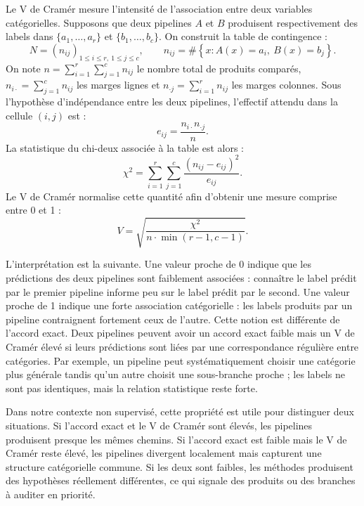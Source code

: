 \documentclass[12pt,a4paper]{report}
\begin{document}
Le V de Cramér mesure l'intensité de l'association entre deux variables catégorielles. Supposons que deux pipelines $A$ et $B$ produisent respectivement des labels dans $\{a_1,\ldots,a_r\}$ et $\{b_1,\ldots,b_c\}$. On construit la table de contingence :
\begin{equation}
    N =
    \left(n_{ij}\right)_{1 \leq i \leq r,\ 1 \leq j \leq c},
    \qquad
    n_{ij}
    =
    \#\left\{x : A(x)=a_i,\ B(x)=b_j\right\}.
\end{equation}
On note $n=\sum_{i=1}^{r}\sum_{j=1}^{c} n_{ij}$ le nombre total de produits comparés, $n_{i\cdot}=\sum_{j=1}^{c}n_{ij}$ les marges lignes et $n_{\cdot j}=\sum_{i=1}^{r}n_{ij}$ les marges colonnes. Sous l'hypothèse d'indépendance entre les deux pipelines, l'effectif attendu dans la cellule $(i,j)$ est :
\begin{equation}
    e_{ij}
    =
    \frac{n_{i\cdot}n_{\cdot j}}{n}.
\end{equation}
La statistique du chi-deux associée à la table est alors :
\begin{equation}
    \chi^2
    =
    \sum_{i=1}^{r}\sum_{j=1}^{c}
    \frac{(n_{ij}-e_{ij})^2}{e_{ij}}.
\end{equation}
Le V de Cramér normalise cette quantité afin d'obtenir une mesure comprise entre 0 et 1 :
\begin{equation}
    V
    =
    \sqrt{
    \frac{\chi^2}
    {n \cdot \min(r-1,c-1)}
    }.
\end{equation}

L'interprétation est la suivante. Une valeur proche de 0 indique que les prédictions des deux pipelines sont faiblement associées : connaître le label prédit par le premier pipeline informe peu sur le label prédit par le second. Une valeur proche de 1 indique une forte association catégorielle : les labels produits par un pipeline contraignent fortement ceux de l'autre. Cette notion est différente de l'accord exact. Deux pipelines peuvent avoir un accord exact faible mais un V de Cramér élevé si leurs prédictions sont liées par une correspondance régulière entre catégories. Par exemple, un pipeline peut systématiquement choisir une catégorie plus générale tandis qu'un autre choisit une sous-branche proche ; les labels ne sont pas identiques, mais la relation statistique reste forte.

Dans notre contexte non supervisé, cette propriété est utile pour distinguer deux situations. Si l'accord exact et le V de Cramér sont élevés, les pipelines produisent presque les mêmes chemins. Si l'accord exact est faible mais le V de Cramér reste élevé, les pipelines divergent localement mais capturent une structure catégorielle commune. Si les deux sont faibles, les méthodes produisent des hypothèses réellement différentes, ce qui signale des produits ou des branches à auditer en priorité.
\end{document}
